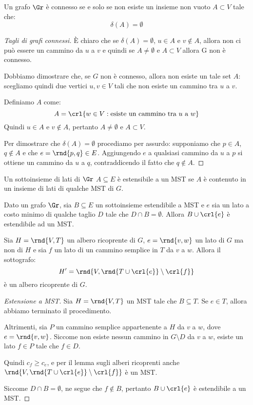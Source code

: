 \documentclass[\main/main.tex]{subfiles}
\begin{document}
\begin{theorem}
  Un grafo \(\Gr \) è connesso se e solo se non esiste un insieme non vuoto \(A \subset V\) tale che:
  \[
    \delta(A) = \emptyset
  \]
\end{theorem}
\begin{proof}[Tagli di grafi connessi]
  È chiaro che se \(\delta(A) = \emptyset \), \(u \in A\) e \(v \not\in A\), allora non ci può essere un cammino da \(u\) a \(v\) e quindi se \(A \neq \emptyset \) e \(A \subset V\) allora G non è connesso.

  Dobbiamo dimostrare che, se \(G\) non è connesso, allora non esiste un tale set \(A\): scegliamo quindi due vertici \(u, v \in V\) tali che non esiste un cammino tra \(u\) a \(v\).

  Definiamo \(A\) come:
  \[
    A = \crl{w \in V: \text{esiste un cammino tra \(u\) a \(w\)}}
  \]
  Quindi \(u \in A\) e \(v \not\in A\), pertanto \(A \neq \emptyset \) e \(A \subset V\).

  Per dimostrare che \(\delta(A) = \emptyset \) procediamo per assurdo: supponiamo che \(p \in A\), \(q \not\in A\) e che \(e = \rnd{p,q} \in E\). Aggiungendo \(e\) a qualsiasi cammino da \(u\) a \(p\) si ottiene un cammino da \(u\) a \(q\), contraddicendo il fatto che \(q \not\in A\).
\end{proof}
\begin{definition}
  Un sottoinsieme di lati di \(\Gr \) \(A \subseteq E\) è estensibile a un MST se \(A\) è contenuto in un insieme di lati di qualche MST di \(G\).
\end{definition}
\begin{theorem}
  Dato un grafo \(\Gr \), sia \(B \subseteq E\) un sottoinsieme estendibile a MST e \(e\) sia un lato a costo minimo di qualche taglio \(D\) tale che \(D \cap B = \emptyset \). Allora \(B \cup \crl{e}\) è estendibile ad un MST.
\end{theorem}
\begin{lemma}
  Sia \(H = \rnd{V, T}\) un albero ricoprente di \(G\), \(e = \rnd{v,w}\) un lato di \(G\) ma non di \(H\) e sia \(f\) un lato di un cammino semplice in \(T\) da \(v\) a \(w\). Allora il sottografo:
  \[
    H' = \rnd{V, \rnd{T \cup \crl{e}}\setminus \crl{f}}
  \]
  è un albero ricoprente di \(G\).
\end{lemma}
\begin{proof}[Estensione a MST]
  Sia \(H = \rnd{V, T}\) un MST tale che \(B \subseteq T\). Se \(e \in T\), allora abbiamo terminato il procedimento.

  Altrimenti, sia \(P\) un cammino semplice appartenente a \(H\) da \(v\) a \(w\), dove \(e = \rnd{v, w}\). Siccome non esiste nessun cammino in \(G\setminus D\) da \(v\) a \(w\), esiste un lato \(f \in P\) tale che \(f \in D\).

  Quindi \(c_f \geq c_e\), e per il lemma sugli alberi ricoprenti anche \(\rnd{V, \rnd{T \cup \crl{e}} \setminus \crl{f}}\) è un MST.

  Siccome \(D \cap B = \emptyset \), ne segue che \(f \not\in B\), pertanto \(B \cup \crl{e}\) è estendibile a un MST.
\end{proof}
\clearpage
\end{document}

